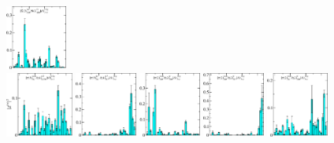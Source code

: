\begin{figure}[H]
    \includegraphics[width=0.18\textwidth]{figures/sigmas/g2g/zfactors/zfactor_isotriplet_kbar_nucleon-G2g_1-P111-A2-SS_0-P-1-1-1-G-SS_0.pdf}\\
    \includegraphics[width=0.1975\textwidth]{figures/sigmas/g2g/zfactors/zfactor_isotriplet_pion_lambda-G2g_1-P001-A2m-SS_1-P00-1-G2-LSD_1.pdf}
    \includegraphics[width=0.18\textwidth]{figures/sigmas/g2g/zfactors/zfactor_isotriplet_pion_lambda-G2g_1-P001-Ep-SS_1-P00-1-G1-SS_1.pdf}
    \includegraphics[width=0.18\textwidth]{figures/sigmas/g2g/zfactors/zfactor_isotriplet_pion_lambda-G2g_1-P011-A2m-SS_0-P0-1-1-G-SS_0.pdf}
    \includegraphics[width=0.18\textwidth]{figures/sigmas/g2g/zfactors/zfactor_isotriplet_pion_lambda-G2g_1-P011-A2m-SS_0-P0-1-1-G-SS_1.pdf}
    \includegraphics[width=0.18\textwidth]{figures/sigmas/g2g/zfactors/zfactor_isotriplet_pion_lambda-G2g_1-P011-A2m-SS_1-P0-1-1-G-SS_0.pdf}\\

\end{figure}
